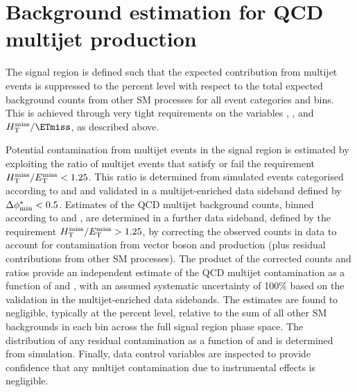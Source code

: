 \section{Background estimation for QCD multijet production}
\label{sec:qcd_background}

The signal region is defined such that the expected contribution from
multijet events is suppressed to the percent level with respect to the
total expected background counts from other SM processes for all event
categories and \scalht bins. This is achieved through very tight
requirements on the variables \alphat, \dphi, and $\mht / \ETmiss$, as
described above. 

Potential contamination from multijet events in the signal region is
estimated by exploiting the ratio of multijet events that satisfy or
fail the requirement $H_{\mathrm{T}}^{\text{miss}} / E_{\mathrm{T}}^{\text{miss}} < 1.25$. This ratio is determined from
simulated events categorised according to \njet and \scalht and
validated in a multijet-enriched data sideband defined by $\Delta\phi^{*}_{\rm min} <
0.5$. Estimates of the QCD multijet background counts, binned
according to \njet and \scalht, are determined in a further data
sideband, defined by the requirement $H_{\mathrm{T}}^{\text{miss}} / E_{\mathrm{T}}^{\text{miss}} > 1.25$, by correcting
the observed counts in data to account for contamination from vector
boson and \ttbar production (plus residual contributions from other SM
processes). The product of the corrected counts and ratios provide an
independent estimate of the QCD multijet contamination as a function
of \njet and \scalht, with an assumed systematic uncertainty of 100\%
based on the validation in the multijet-enriched data sidebands. The
estimates are found to negligible, typically at the percent level,
relative to the sum of all other SM backgrounds in each bin across the
full signal region phase space. The distribution of any residual
contamination as a function of \nb and \mht is determined from
simulation. Finally, data control variables are inspected to provide
confidence that any multijet contamination due to instrumental effects
is negligible.

